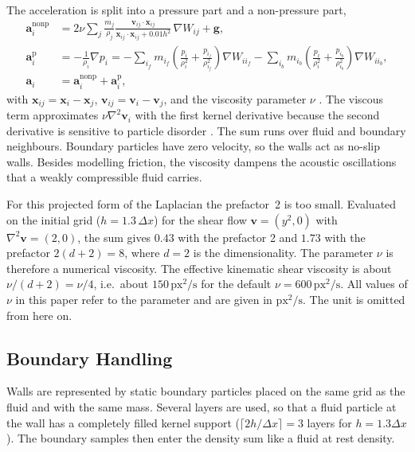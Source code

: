 The acceleration is split into a pressure part and
a non-pressure part,
\begin{align}
    \boldsymbol{a}_i^\mathrm{nonp} &= 2\nu \sum_j \frac{m_j}{\rho_j}
        \frac{\boldsymbol{v}_{ij}\cdot\boldsymbol{x}_{ij}}{\boldsymbol{x}_{ij}\cdot\boldsymbol{x}_{ij} + 0.01h^2}\,\nabla W_{ij}
        + \boldsymbol{g},\\
    \boldsymbol{a}_i^\mathrm{p} &= -\frac{1}{\rho_i}\nabla p_i
        = -\sum_{i_f} m_{i_f}\left(\frac{p_i}{\rho_i^2} + \frac{p_{i_f}}{\rho_{i_f}^2}\right)\nabla W_{i i_f}
          -\sum_{i_b} m_{i_b}\left(\frac{p_i}{\rho_i^2} + \frac{p_{i_b}}{\rho_{i_b}^2}\right)\nabla W_{i i_b},\\
    \boldsymbol{a}_i &= \boldsymbol{a}_i^\mathrm{nonp} + \boldsymbol{a}_i^\mathrm{p},
\end{align}
with $\boldsymbol{x}_{ij} = \boldsymbol{x}_i - \boldsymbol{x}_j$,
$\boldsymbol{v}_{ij} = \boldsymbol{v}_i - \boldsymbol{v}_j$, and the viscosity
parameter $\nu$ \cite{teschner_notes}. The viscous term approximates
$\nu\nabla^2\boldsymbol{v}_i$ with the first kernel derivative because the second
derivative is sensitive to particle disorder \cite{morris1997}. The sum runs over
fluid and boundary neighbours. Boundary particles have zero velocity, so the
walls act as no-slip walls. Besides modelling friction, the viscosity dampens
the acoustic oscillations that a weakly compressible fluid carries.

For this projected form of the Laplacian the prefactor~2 is too small.
Evaluated on the initial grid ($h = 1.3\,\Delta x$) for the shear flow
$\boldsymbol{v} = (y^2, 0)$ with $\nabla^2\boldsymbol{v} = (2, 0)$, the sum gives
$0.43$ with the prefactor 2 and $1.73$ with the prefactor $2(d+2) = 8$, where
$d = 2$ is the dimensionality. The parameter $\nu$ is therefore a numerical
viscosity. The effective kinematic shear viscosity is about $\nu/(d+2) = \nu/4$,
i.e.\ about $150\,\mathrm{px^2/s}$ for the default $\nu = 600\,\mathrm{px^2/s}$.
All values of $\nu$ in this paper refer to the parameter and are given in
$\mathrm{px^2/s}$. The unit is omitted from here on.

\subsection{Boundary Handling}
\label{sec:boundary}

Walls are represented by static boundary particles placed on the same grid as
the fluid and with the same mass. Several layers are used, so that a fluid
particle at the wall has a completely filled kernel support
($\lceil 2h/\Delta x \rceil = 3$ layers for $h = 1.3\Delta x$). The boundary
samples then enter the density sum like a fluid at rest density.

